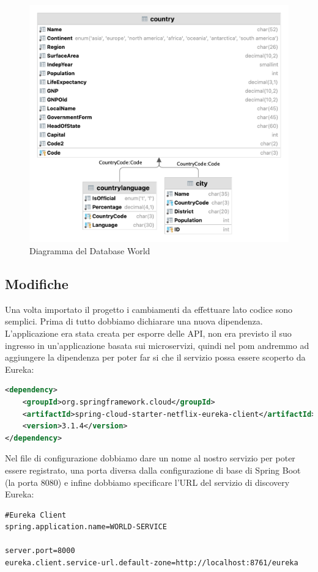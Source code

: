 \begin{figure}[h]
    \centering
    \includegraphics[scale=0.25]{capitoli/immagini/17_world_database.png}
    \caption{Diagramma del Database World}
    \label{fig:database}
\end{figure}

\subsection{Modifiche}
Una volta importato il progetto i cambiamenti da effettuare lato codice sono semplici. Prima di tutto dobbiamo dichiarare una nuova dipendenza. L'applicazione era stata creata per esporre delle API, non era previsto il suo ingresso in un'applicazione basata sui microservizi, quindi nel pom andremmo ad aggiungere la dipendenza per poter far si che il servizio possa essere scoperto da Eureka:

\begin{lstlisting}[language=xml, caption= Dipendenza di Eureka Client]
<dependency>
    <groupId>org.springframework.cloud</groupId>
    <artifactId>spring-cloud-starter-netflix-eureka-client</artifactId>
    <version>3.1.4</version>
</dependency>
\end{lstlisting}

Nel file di configurazione dobbiamo dare un nome al nostro servizio per poter essere registrato, una porta diversa dalla configurazione di base di Spring Boot (la porta 8080) e infine dobbiamo specificare l'URL del servizio di discovery Eureka:
\begin{lstlisting}[caption = Configurazione per Eureka]
#Eureka Client
spring.application.name=WORLD-SERVICE

server.port=8000
eureka.client.service-url.default-zone=http://localhost:8761/eureka
\end{lstlisting}

